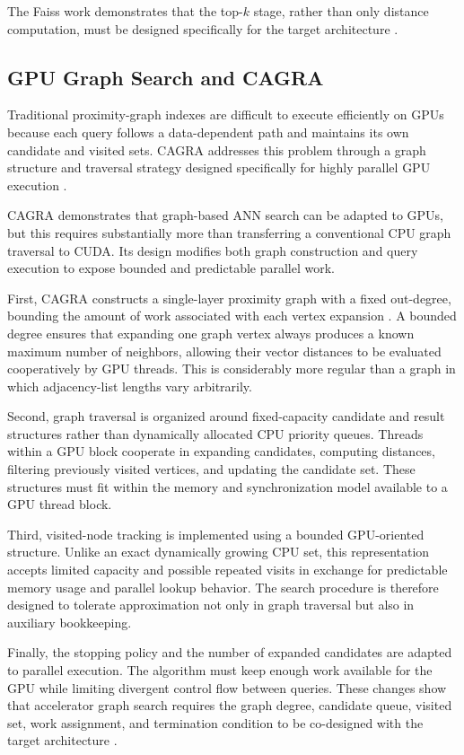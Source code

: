 The Faiss work demonstrates that the top-\(k\) stage, rather than only distance computation, must be designed specifically for the target architecture \cite{faiss}.

\subsection{GPU Graph Search and CAGRA}
\label{subsec:cagra}

Traditional proximity-graph indexes are difficult to execute efficiently on GPUs because each query follows a data-dependent path and maintains its own candidate and visited sets. CAGRA addresses this problem through a graph structure and traversal strategy designed specifically for highly parallel GPU execution \cite{cagra}.

CAGRA demonstrates that graph-based ANN search can be adapted to GPUs, but this requires substantially more than transferring a conventional CPU graph traversal to CUDA. Its design modifies both graph construction and query execution to expose bounded and predictable parallel work.

First, CAGRA constructs a single-layer proximity graph with a fixed out-degree, bounding the amount of work associated with each vertex expansion \cite{cagra}. A bounded degree ensures that expanding one graph vertex always produces a known maximum number of neighbors, allowing their vector distances to be evaluated cooperatively by GPU threads. This is considerably more regular than a graph in which adjacency-list lengths vary arbitrarily.

Second, graph traversal is organized around fixed-capacity candidate and result structures rather than dynamically allocated CPU priority queues. Threads within a GPU block cooperate in expanding candidates, computing distances, filtering previously visited vertices, and updating the candidate set. These structures must fit within the memory and synchronization model available to a GPU thread block.

Third, visited-node tracking is implemented using a bounded GPU-oriented structure. Unlike an exact dynamically growing CPU set, this representation accepts limited capacity and possible repeated visits in exchange for predictable memory usage and parallel lookup behavior. The search procedure is therefore designed to tolerate approximation not only in graph traversal but also in auxiliary bookkeeping.

Finally, the stopping policy and the number of expanded candidates are adapted to parallel execution. The algorithm must keep enough work available for the GPU while limiting divergent control flow between queries. These changes show that accelerator graph search requires the graph degree, candidate queue, visited set, work assignment, and termination condition to be co-designed with the target architecture \cite{cagra}.

